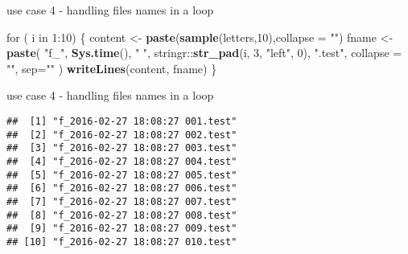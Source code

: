 \documentclass[ignorenonframetext,]{beamer}
\newenvironment{Shaded}{\begin{snugshade}}{\end{snugshade}}
\newcommand{\KeywordTok}[1]{\textcolor[rgb]{0.13,0.29,0.53}{\textbf{{#1}}}}
\newcommand{\DataTypeTok}[1]{\textcolor[rgb]{0.13,0.29,0.53}{{#1}}}
\newcommand{\DecValTok}[1]{\textcolor[rgb]{0.00,0.00,0.81}{{#1}}}
\newcommand{\CharTok}[1]{\textcolor[rgb]{0.31,0.60,0.02}{{#1}}}
\newcommand{\StringTok}[1]{\textcolor[rgb]{0.31,0.60,0.02}{{#1}}}
\newcommand{\NormalTok}[1]{{#1}}
\begin{document}
\begin{frame}[fragile]{use case 4 - handling files names in a loop}

\begin{Shaded}
\begin{Highlighting}[]
\NormalTok{for ( i in }\DecValTok{1}\NormalTok{:}\DecValTok{10}\NormalTok{) \{}
  \NormalTok{content <-}\StringTok{ }\KeywordTok{paste}\NormalTok{(}\KeywordTok{sample}\NormalTok{(letters,}\DecValTok{10}\NormalTok{),}\DataTypeTok{collapse =} \StringTok{""}\NormalTok{)}
  \NormalTok{fname   <-}\StringTok{ }
\StringTok{    }\KeywordTok{paste}\NormalTok{(}
      \StringTok{"f_"}\NormalTok{, }
      \KeywordTok{Sys.time}\NormalTok{(), }\StringTok{" "}\NormalTok{, }
      \NormalTok{stringr::}\KeywordTok{str_pad}\NormalTok{(i, }\DecValTok{3}\NormalTok{, }\StringTok{"left"}\NormalTok{, }\DecValTok{0}\NormalTok{),  }
      \StringTok{".test"}\NormalTok{,}
      \DataTypeTok{collapse =} \StringTok{""}\NormalTok{, }\DataTypeTok{sep=}\StringTok{""}
    \NormalTok{)}
  \KeywordTok{writeLines}\NormalTok{(content, fname)}
\NormalTok{\}}
\end{Highlighting}
\end{Shaded}

\end{frame}

\begin{frame}[fragile]{use case 4 - handling files names in a loop}

\begin{Shaded}
\end{Shaded}

\begin{verbatim}
##  [1] "f_2016-02-27 18:08:27 001.test"
##  [2] "f_2016-02-27 18:08:27 002.test"
##  [3] "f_2016-02-27 18:08:27 003.test"
##  [4] "f_2016-02-27 18:08:27 004.test"
##  [5] "f_2016-02-27 18:08:27 005.test"
##  [6] "f_2016-02-27 18:08:27 006.test"
##  [7] "f_2016-02-27 18:08:27 007.test"
##  [8] "f_2016-02-27 18:08:27 008.test"
##  [9] "f_2016-02-27 18:08:27 009.test"
## [10] "f_2016-02-27 18:08:27 010.test"
\end{verbatim}

\end{frame}
\end{document}
